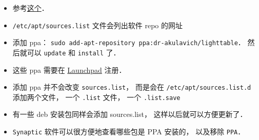 
\begin{issues}
\issueDraft
\end{issues}


\begin{itemize}
\item 参考\href{https://itsfoss.com/ppa-guide/}{这个}．
\item \verb|/etc/apt/sources.list| 文件会列出软件 repo 的网址
\item 添加 ppa： \verb|sudo add-apt-repository ppa:dr-akulavich/lighttable|． 然后就可以 \verb|update| 和 \verb|install| 了．
\item 这些 ppa 需要在 \href{https://launchpad.net/}{Launchpad} 注册．
\item 添加 ppa 并不会改变 \verb|sources.list|， 而是会在 \verb|/etc/apt/sources.list.d| 添加两个文件， 一个 \verb|.list| 文件， 一个 \verb|.list.save|
\item 有一些 deb 安装包同样会添加 sources.list， 这样以后就可以方便更新了．
\item \verb|Synaptic| 软件可以很方便地查看哪些包是 PPA 安装的， 以及移除 \verb|PPA|．
\end{itemize}
